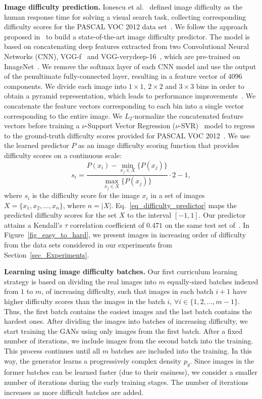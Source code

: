 \documentclass[10pt,twocolumn,letterpaper]{article}
\begin{document}
\noindent
{\bf Image difficulty prediction.}
Ionescu et al.~\cite{Ionescu-CVPR-2016} defined  image difficulty as the human response time for solving a visual search task, collecting corresponding difficulty scores for the PASCAL VOC 2012 data set~\cite{Pascal-VOC-2012}. We follow the approach proposed in~\cite{Ionescu-CVPR-2016} to build a state-of-the-art image difficulty predictor. The model is based on concatenating deep features extracted from two Convolutional Neural Networks (CNN), VGG-f~\cite{Chatfield-BMVC-14} and VGG-verydeep-16~\cite{Simonyan-ICLR-14}, which are pre-trained on ImageNet~\cite{Russakovsky2015}. We remove the softmax layer of each CNN model and use the output of the penultimate fully-connected layer, resulting in a feature vector of $4096$ components. We divide each image into $1 \times 1$, $2 \times 2$ and $3 \times 3$ bins in order to obtain a pyramid representation, which leads to performance improvements~\cite{Ionescu-CVPR-2016}. We concatenate the feature vectors corresponding to each bin into a single vector corresponding to the entire image. We $L_2$-normalize the concatenated feature vectors before training a $\nu$-Support Vector Regression ($\nu$-SVR)~\cite{Chang-NC-2002} model to regress to the ground-truth difficulty scores provided for PASCAL VOC 2012~\cite{Pascal-VOC-2012}. We use the learned predictor $P$ as an image difficulty scoring function that provides difficulty scores on a continuous scale:
\begin{equation}\label{eq_difficulty_predictor}
s_i = \frac{P(x_i) -  \min_{x_j \in X}\{P(x_j)\}}{\max_{x_j \in X}\{P(x_j)\}} \cdot 2 - 1,
\end{equation}
where $s_i$ is the difficulty score for the image $x_i$ in a set of images $X = \{x_1, x_2, ...,x_n\}$, where $n=|X|$. Eq.~\eqref{eq_difficulty_predictor} maps the predicted difficulty scores for the set $X$ to the interval $[-1, 1]$. Our predictor attains a Kendall's $\tau$ correlation coefficient of $0.471$ on the same test set of~\cite{Ionescu-CVPR-2016}. In Figure~\ref{fig_easy_to_hard}, we present images in increasing order of difficulty from the data sets considered in our experiments from Section~\ref{sec_Experiments}.

\noindent
{\bf Learning using image difficulty batches.}
Our first curriculum learning strategy is based on dividing the real images into $m$ equally-sized batches indexed from $1$ to $m$, of increasing difficulty, such that images in each batch $i+1$ have higher difficulty scores than the images in the batch $i$, $\forall i \in \{1,2,...,m-1\}$. Thus, the first batch contains the easiest images and the last batch contains the hardest ones. After dividing the images into batches of increasing difficulty, we start training the GANs using only images from the first batch. After a fixed number of iterations, we include images from the second batch into the training. This process continues until all $m$ batches are included into the training. In this way, the generator learns a progressively complex density $p_g$. Since images in the former batches can be learned faster (due to their easiness), we consider a smaller number of iterations during the early training stages. The number of iterations increases as more difficult batches are added.
\end{document}
